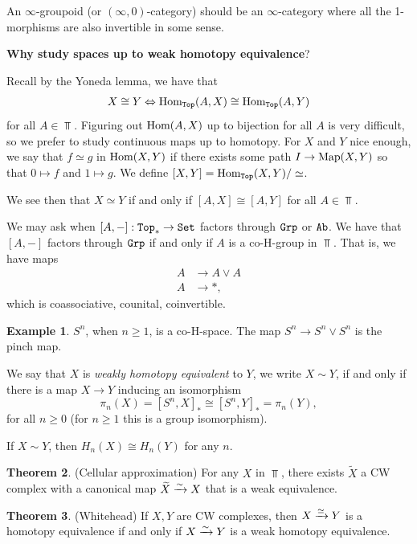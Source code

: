 \documentclass[12pt]{amsart}
\let\til\widetilde
\theoremstyle{definition}
\newtheorem{theorem}{Theorem}[section]
\newtheorem{example}[theorem]{Example}
\begin{document}
An $\infty$-groupoid (or $(\infty,0)$-category) should be an $\infty$-category where all the 1-morphisms are also invertible in some sense.

\textbf{Why study spaces up to weak homotopy equivalence}?

Recall by the Yoneda lemma, we have that
\begin{align*}
    X \cong Y \Leftrightarrow \text{Hom}_{\texttt{Top}}(A,X) \cong \text{Hom}_{\texttt{Top}}(A,Y)
\end{align*}
for all $A\in \Top$. Figuring out $\text{Hom}(A,X)$ up to bijection for all $A$ is very difficult, so we prefer to study continuous maps up to homotopy. For $X$ and $Y$ nice enough, we say that $f\simeq g$ in $\text{Hom}(X,Y)$ if there exists some path $I \to \text{Map}(X,Y)$ so that $0 \mapsto f$ and $1 \mapsto g$. We define $[X,Y] = \text{Hom}_{\texttt{Top}}(X,Y)/\simeq$.

We see then that $X \simeq Y$ if and only if $[A,X] \cong [A,Y]$ for all $A \in \Top$.

We may ask when $[A,-] : \texttt{Top}_\ast \to \texttt{Set}$ factors through $\texttt{Grp}$ or $\texttt{Ab}$. We have that $[A,-]$ factors through $\texttt{Grp}$ if and only if $A$ is a co-H-group in $\Top$. That is, we have maps
\begin{align*}
    A &\to A \vee A \\
    A &\to \ast,
\end{align*}
which is coassociative, counital, coinvertible.

\begin{example} $S^n$, when $n \ge 1$, is a co-H-space. The map $S^n \to S^n \vee S^n$ is the pinch map.
\end{example}

We say that $X$ is \textit{weakly homotopy equivalent} to $Y$, we write $X \sim Y$, if and only if there is a map $X \to Y$ inducing an isomorphism 
\[
\pi_n(X) = [S^n,X]_\ast \cong [S^n,Y]_\ast = \pi_n(Y),
\]
for all $n \ge 0$ (for $n \ge 1$ this is a group isomorphism).

If $X \sim Y$, then $H_n(X) \cong H_n(Y)$ for any $n$.

\begin{theorem} (Cellular approximation) For any $X$ in $\Top$, there exists $\til{X}$ a CW complex with a canonical map $\til{X} \xto{\sim} X$ that is a weak equivalence.
\end{theorem}

\begin{theorem} (Whitehead) If $X,Y$ are CW complexes, then $X \xrightarrow{\simeq} Y$ is a homotopy equivalence if and only if $X \xrightarrow{\sim} Y$ is a weak homotopy equivalence.
\end{theorem}
\end{document}
